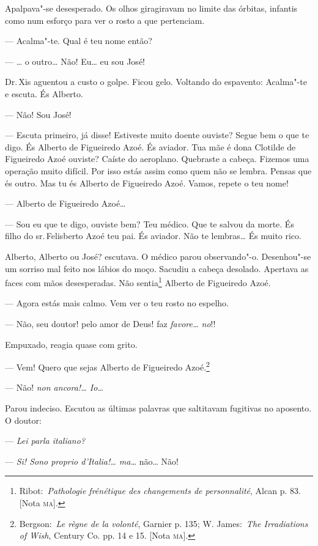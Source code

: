 Apalpava"-se desesperado. Os olhos giragiravam no limite das órbitas,
infantis como num esforço para ver o rosto a que pertenciam.

--- Acalma"-te. Qual é teu nome então?

--- \ldots{} o outro\ldots{} Não! Eu\ldots{} eu sou José!

Dr.\,Xis aguentou a custo o golpe. Ficou gelo. Voltando do espavento:
Acalma"-te e escuta. És Alberto.

--- Não! Sou José!

--- Escuta primeiro, já disse! Estiveste muito doente ouviste? Segue bem
o que te digo. És Alberto de Figueiredo Azoé. És aviador. Tua mãe é dona
Clotilde de Figueiredo Azoé ouviste? Caíste do aeroplano. Quebraste a
cabeça. Fizemos uma operação muito difícil. Por isso estás assim como
quem não se lembra. Pensas que és outro. Mas tu és Alberto de Figueiredo
Azoé. Vamos, repete o teu nome!

--- Alberto de Figueiredo Azoé\ldots{}

--- Sou eu que te digo, ouviste bem? Teu médico. Que te salvou da morte.
És filho do sr.\,Felisberto Azoé teu pai. És aviador. Não te lembras\ldots{}
És muito rico.

Alberto, Alberto ou José? escutava. O médico parou observando"-o.
Desenhou"-se um sorriso mal feito nos lábios do moço. Sacudiu a cabeça
desolado. Apertava as faces com mãos desesperadas. Não sentia\footnote{Ribot:~\emph{Pathologie
  frénétique des changements de personnalité}, Alcan p. 83. {[}Nota
  \textsc{ma}{]}.} Alberto de Figueiredo Azoé.

--- Agora estás mais calmo. Vem ver o teu rosto no espelho.

--- Não, seu doutor! pelo amor de Deus! faz \emph{favore\ldots{} no}!!

Empuxado, reagia quase com grito.

--- Vem! Quero que sejas Alberto de Figueiredo Azoé.\footnote{Bergson:~\emph{Le
  règne de la volonté}, Garnier p. 135; W. James:~\emph{The Irradiations
  of Wish}, Century Co. pp. 14 e 15. {[}Nota \textsc{ma}{]}.}

--- Não! \emph{non ancora!\ldots{} Io\ldots{}}

Parou indeciso. Escutou as últimas palavras que saltitavam fugitivas no
aposento. O doutor:

--- \emph{Lei parla italiano?}

--- \emph{Si! Sono proprio d'Italia!\ldots{} ma\ldots{}} não\ldots{} Não!

